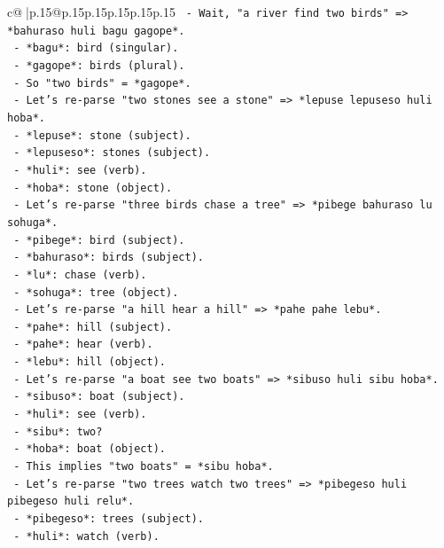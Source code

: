 \documentclass{article}
\begin{document}
{\begin{supertabular}{c@{$\;$}|p{.15\linewidth}@{}p{.15\linewidth}p{.15\linewidth}p{.15\linewidth}p{.15\linewidth}p{.15\linewidth}}
{{{\texttt{      {-} Wait, "a river find two birds" => *bahuraso huli bagu gagope*.} \\
\texttt{      {-} *bagu*: bird (singular).} \\
\texttt{      {-} *gagope*: birds (plural).} \\
\texttt{      {-} So "two birds" = *gagope*.} \\
\texttt{    {-} Let's re{-}parse "two stones see a stone" => *lepuse lepuseso huli hoba*.} \\
\texttt{      {-} *lepuse*: stone (subject).} \\
\texttt{      {-} *lepuseso*: stones (subject).} \\
\texttt{      {-} *huli*: see (verb).} \\
\texttt{      {-} *hoba*: stone (object).} \\
\texttt{    {-} Let's re{-}parse "three birds chase a tree" => *pibege bahuraso lu sohuga*.} \\
\texttt{      {-} *pibege*: bird (subject).} \\
\texttt{      {-} *bahuraso*: birds (subject).} \\
\texttt{      {-} *lu*: chase (verb).} \\
\texttt{      {-} *sohuga*: tree (object).} \\
\texttt{    {-} Let's re{-}parse "a hill hear a hill" => *pahe pahe lebu*.} \\
\texttt{      {-} *pahe*: hill (subject).} \\
\texttt{      {-} *pahe*: hear (verb).} \\
\texttt{      {-} *lebu*: hill (object).} \\
\texttt{    {-} Let's re{-}parse "a boat see two boats" => *sibuso huli sibu hoba*.} \\
\texttt{      {-} *sibuso*: boat (subject).} \\
\texttt{      {-} *huli*: see (verb).} \\
\texttt{      {-} *sibu*: two?} \\
\texttt{      {-} *hoba*: boat (object).} \\
\texttt{      {-} This implies "two boats" = *sibu hoba*.} \\
\texttt{    {-} Let's re{-}parse "two trees watch two trees" => *pibegeso huli pibegeso huli relu*.} \\
\texttt{      {-} *pibegeso*: trees (subject).} \\
\texttt{      {-} *huli*: watch (verb).} \\
}}}
\end{supertabular}}
\end{document}
